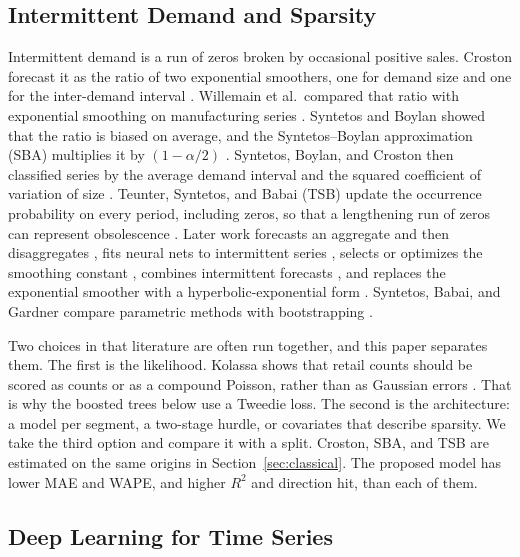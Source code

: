 \documentclass[review,authoryear]{elsarticle}
\begin{document}
\subsection{Intermittent Demand and Sparsity}
\label{sec:intermittent}

Intermittent demand is a run of zeros broken by occasional positive sales. Croston forecast it as the ratio of two exponential smoothers, one for demand size and one for the inter-demand interval \citep{croston1972forecasting}. Willemain et al.\ compared that ratio with exponential smoothing on manufacturing series \citep{willemain1994croston}. Syntetos and Boylan showed that the ratio is biased on average, and the Syntetos--Boylan approximation (SBA) multiplies it by $(1 - \alpha/2)$ \citep{syntetos2001bias,syntetos2005sba}. Syntetos, Boylan, and Croston then classified series by the average demand interval and the squared coefficient of variation of size \citep{syntetos2005categorization}. Teunter, Syntetos, and Babai (TSB) update the occurrence probability on every period, including zeros, so that a lengthening run of zeros can represent obsolescence \citep{teunter2011tsb}. Later work forecasts an aggregate and then disaggregates \citep{nikolopoulos2011adida}, fits neural nets to intermittent series \citep{kourentzes2013nn}, selects or optimizes the smoothing constant \citep{kourentzes2014select}, combines intermittent forecasts \citep{petropoulos2015comb}, and replaces the exponential smoother with a hyperbolic-exponential form \citep{prestwich2014hyperbolic}. Syntetos, Babai, and Gardner compare parametric methods with bootstrapping \citep{syntetos2015forecasting}.

Two choices in that literature are often run together, and this paper separates them. The first is the likelihood. Kolassa shows that retail counts should be scored as counts or as a compound Poisson, rather than as Gaussian errors \citep{kolassa2016count}. That is why the boosted trees below use a Tweedie loss. The second is the architecture: a model per segment, a two-stage hurdle, or covariates that describe sparsity. We take the third option and compare it with a split. Croston, SBA, and TSB are estimated on the same origins in Section~\ref{sec:classical}. The proposed model has lower MAE and WAPE, and higher $R^{2}$ and direction hit, than each of them.

\subsection{Deep Learning for Time Series}
\end{document}
